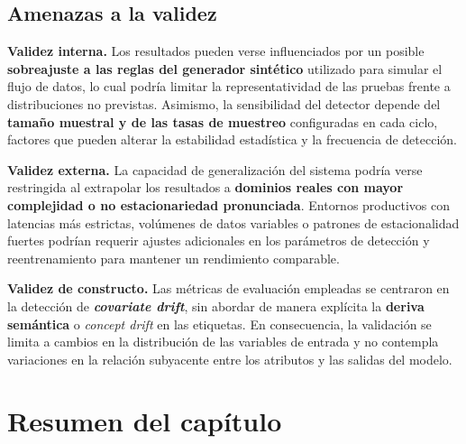 \subsection{Amenazas a la validez}

\textbf{Validez interna.}  
Los resultados pueden verse influenciados por un posible \textbf{sobreajuste a las reglas del generador sintético} utilizado para simular el flujo de datos, lo cual podría limitar la representatividad de las pruebas frente a distribuciones no previstas.  
Asimismo, la sensibilidad del detector depende del \textbf{tamaño muestral y de las tasas de muestreo} configuradas en cada ciclo, factores que pueden alterar la estabilidad estadística y la frecuencia de detección.

\textbf{Validez externa.}  
La capacidad de generalización del sistema podría verse restringida al extrapolar los resultados a \textbf{dominios reales con mayor complejidad o no estacionariedad pronunciada}.  
Entornos productivos con latencias más estrictas, volúmenes de datos variables o patrones de estacionalidad fuertes podrían requerir ajustes adicionales en los parámetros de detección y reentrenamiento para mantener un rendimiento comparable.

\textbf{Validez de constructo.}  
Las métricas de evaluación empleadas se centraron en la detección de \textbf{\textit{covariate drift}}, sin abordar de manera explícita la \textbf{deriva semántica} o \textit{concept drift} en las etiquetas.  
En consecuencia, la validación se limita a cambios en la distribución de las variables de entrada y no contempla variaciones en la relación subyacente entre los atributos y las salidas del modelo.



\section{Resumen del capítulo}

